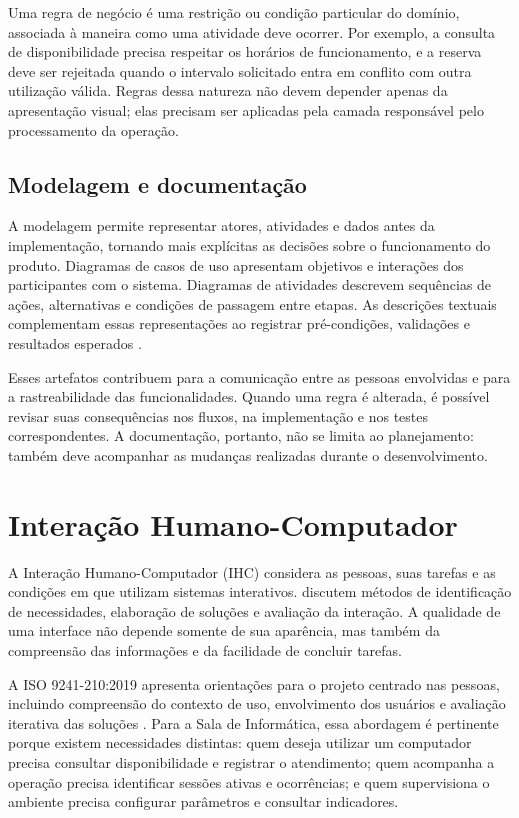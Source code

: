 Uma regra de negócio é uma restrição ou condição particular do domínio, associada à maneira como uma atividade deve ocorrer. Por exemplo, a consulta de disponibilidade precisa respeitar os horários de funcionamento, e a reserva deve ser rejeitada quando o intervalo solicitado entra em conflito com outra utilização válida. Regras dessa natureza não devem depender apenas da apresentação visual; elas precisam ser aplicadas pela camada responsável pelo processamento da operação.

\subsection{Modelagem e documentação}

A modelagem permite representar atores, atividades e dados antes da implementação, tornando mais explícitas as decisões sobre o funcionamento do produto. Diagramas de casos de uso apresentam objetivos e interações dos participantes com o sistema. Diagramas de atividades descrevem sequências de ações, alternativas e condições de passagem entre etapas. As descrições textuais complementam essas representações ao registrar pré-condições, validações e resultados esperados \cite{sommerville2016}.

Esses artefatos contribuem para a comunicação entre as pessoas envolvidas e para a rastreabilidade das funcionalidades. Quando uma regra é alterada, é possível revisar suas consequências nos fluxos, na implementação e nos testes correspondentes. A documentação, portanto, não se limita ao planejamento: também deve acompanhar as mudanças realizadas durante o desenvolvimento.

\section{Interação Humano-Computador}\label{sec:ihc}

A Interação Humano-Computador (IHC) considera as pessoas, suas tarefas e as condições em que utilizam sistemas interativos.  discutem métodos de identificação de necessidades, elaboração de soluções e avaliação da interação. A qualidade de uma interface não depende somente de sua aparência, mas também da compreensão das informações e da facilidade de concluir tarefas.

A ISO 9241-210:2019 apresenta orientações para o projeto centrado nas pessoas, incluindo compreensão do contexto de uso, envolvimento dos usuários e avaliação iterativa das soluções \cite{iso9241_210_2019}. Para a Sala de Informática, essa abordagem é pertinente porque existem necessidades distintas: quem deseja utilizar um computador precisa consultar disponibilidade e registrar o atendimento; quem acompanha a operação precisa identificar sessões ativas e ocorrências; e quem supervisiona o ambiente precisa configurar parâmetros e consultar indicadores.

